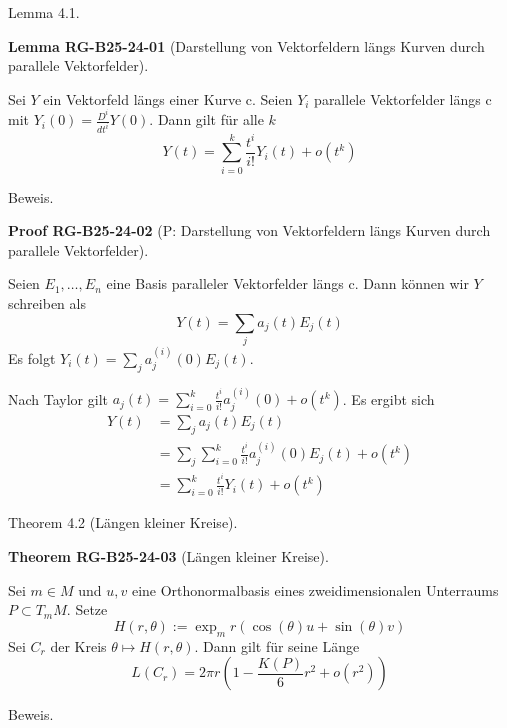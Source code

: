 \documentclass[10pt, letterpaper]{article}
\newcommand{\CustomHeading}[3]{%
  \par\medskip\noindent%
  \textbf{#1 #2} \textnormal{(#3)}.\enskip%
}
\newenvironment{THEO}[2]{\begin{unitbox}\CustomHeading{Theorem}{#1}{#2}}{\end{unitbox}}
\newenvironment{LEM}[2]{\begin{unitbox}\CustomHeading{Lemma}{#1}{#2}}{\end{unitbox}}
\newenvironment{PROOF}[2]{\begin{unitbox}\CustomHeading{Proof}{#1}{#2}}{\end{unitbox}}
\begin{document}
Lemma 4.1. 


\begin{LEM}{RG-B25-24-01}{Darstellung von Vektorfeldern längs Kurven durch parallele Vektorfelder}
Sei $Y$ ein Vektorfeld längs einer Kurve c. Seien $Y_{i}$ parallele Vektorfelder längs c mit $Y_{i}(0)=\frac{D^{i}}{d t^{i}} Y(0)$. Dann gilt für alle $k$
$$
Y(t)=\sum_{i=0}^{k} \frac{t^{i}}{i!} Y_{i}(t)+o\left(t^{k}\right)
$$
\end{LEM}

Beweis. 

\begin{PROOF}{RG-B25-24-02}{P: Darstellung von Vektorfeldern längs Kurven durch parallele Vektorfelder}
Seien $E_{1}, \ldots, E_{n}$ eine Basis paralleler Vektorfelder längs c. Dann können wir $Y$ schreiben als
$$
Y(t)=\sum_{j} a_{j}(t) E_{j}(t)
$$
Es folgt $Y_{i}(t)=\sum_{j} a_{j}^{(i)}(0) E_{j}(t)$.

Nach Taylor gilt $a_{j}(t)=\sum_{i=0}^{k} \frac{t^{i}}{i!} a_{j}^{(i)}(0)+o\left(t^{k}\right)$. Es ergibt sich
$$
\begin{aligned}
Y(t) & =\sum_{j} a_{j}(t) E_{j}(t) \\
& =\sum_{j} \sum_{i=0}^{k} \frac{t^{i}}{i!} a_{j}^{(i)}(0) E_{j}(t)+o\left(t^{k}\right) \\
& =\sum_{i=0}^{k} \frac{t^{i}}{i!} Y_{i}(t)+o\left(t^{k}\right)
\end{aligned}
$$
\end{PROOF}

Theorem 4.2 (Längen kleiner Kreise). 


\begin{THEO}{RG-B25-24-03}{Längen kleiner Kreise}
Sei $m \in M$ und $u, v$ eine Orthonormalbasis eines zweidimensionalen Unterraums $P \subset T_{m} M$. Setze
$$
H(r, \theta):=\exp _{m} r(\cos (\theta) u+\sin (\theta) v)
$$
Sei $C_{r}$ der Kreis $\theta \mapsto H(r, \theta)$. Dann gilt für seine Länge
$$
L\left(C_{r}\right)=2 \pi r\left(1-\frac{K(P)}{6} r^{2}+o\left(r^{2}\right)\right)
$$
\end{THEO}

Beweis. 
\end{document}
